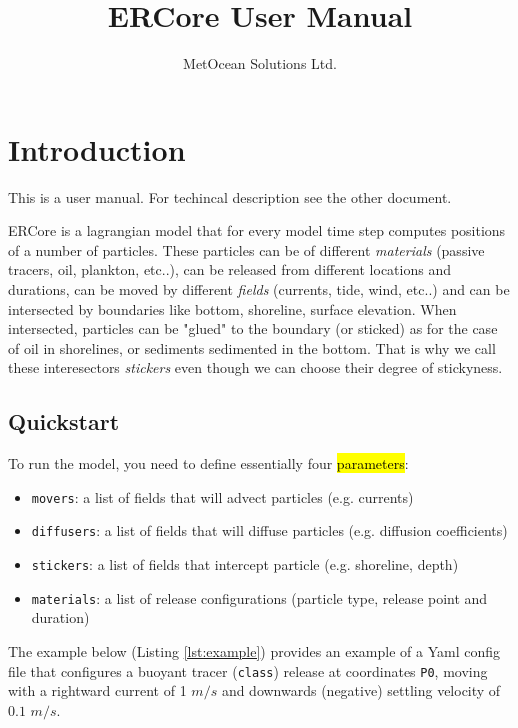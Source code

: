 \documentclass[a4paper]{article}
\title{ERCore User Manual}
\author{MetOcean Solutions Ltd.}
\begin{document}
\maketitle
\tableofcontents

\section{Introduction}
\label{sec:intro}
This is a user manual. For techincal description see the other document.

ERCore is a lagrangian model that for every model time step computes positions of a number of particles. These particles can be of different \textit{materials} (passive tracers, oil, plankton, etc..), can be released from different locations and durations, can be moved by different \textit{fields} (currents, tide, wind, etc..) and can be intersected by boundaries like bottom, shoreline, surface elevation. When intersected, particles can be "glued" to the boundary (or sticked) as for the case of oil in shorelines, or sediments sedimented in the bottom. That is why we call these interesectors \textit{stickers} even though we can choose their degree of stickyness.

\subsection{Quickstart}
\label{ssec:quickstart}
To run the model, you need to define essentially four \hl{parameters}:

\begin{itemize}
\item \texttt{movers}: a list of fields that will advect particles (e.g. currents)
\item \texttt{diffusers}: a list of fields that will diffuse particles (e.g. diffusion coefficients)
\item \texttt{stickers}: a list of fields that intercept particle (e.g. shoreline, depth)
\item \texttt{materials}: a list of release configurations (particle type, release point and duration)
\end{itemize}

The example below (Listing \ref{lst:example}) provides an example of a Yaml config file that configures a buoyant tracer (\texttt{class}) release at coordinates \texttt{P0}, moving with a rightward current of 1 $m/s$ and downwards (negative) settling velocity of $0.1$ $m/s$. 


\end{document}

